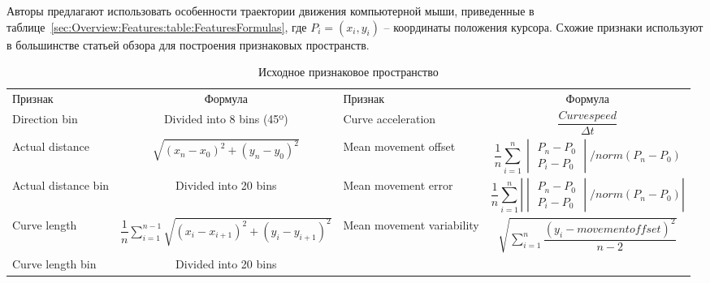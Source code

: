 \documentclass[12pt]{article}
\begin{document}
    \par Авторы \cite{Mondal} предлагают использовать особенности траектории движения компьютерной мыши, приведенные в таблице~\ref{sec:Overview:Features:table:FeaturesFormulas}, где $P_i = (x_i, y_i)$ -- координаты положения курсора. Схожие признаки используют в большинстве статьей обзора для построения признаковых пространств.

    \begin{table}[h]
        \centering
        \footnotesize
        \renewcommand{\arraystretch}{1.5}
        \renewcommand{\tabcolsep}{1mm}
        \caption{Исходное признаковое пространство}
        \begin{tabular}[c]{ || m{20mm} | c || m{20mm} | c ||}
            \hhline{|t:==:t:==:t|} 
            Признак & Формула &  Признак &  Формула \\ [2mm]
            \hhline{|:==::==:|} 
            Direction bin & \centering Divided into 8 bins (45º) &
            Curve acceleration & {\centering $ \dfrac{Curvespeed}{\Delta t} $} \\
            \hhline{||-|-||-|-||}
            Actual distance & {\centering $ \sqrt{(x_n-x_0)^2 + (y_n-y_0)^2} $} &
            Mean movement offset & \begin{equation*} \dfrac{1}{n} \sum_{i=1}^{n} \begin{vmatrix} P_n - P_0 \\ P_i - P_0  \end{vmatrix} / norm(P_n - P_0) \end{equation*} \\
            \hhline{||-|-||-|-||}
            Actual distance bin & {\centering Divided into 20 bins} &
            Mean movement error & {\centering \begin{equation*} \dfrac{1}{n} \sum_{i=1}^{n} \left| \begin{vmatrix} P_n - P_0 \\ P_i - P_0  \end{vmatrix} / norm(P_n - P_0) \right| \end{equation*}} \\
            \hhline{||-|-||-|-||}
            Curve length & {\centering $ \dfrac{1}{n} \sum\limits_{i=1}^{n-1} \sqrt{(x_i-x_{i+1})^2 + (y_i-y_{i+1})^2} $} &
            Mean movement variability & {\centering $ \sqrt{\sum\limits_{i=1}^{n} \dfrac{(y_i - movementoffset)^2}{n-2}} $} \\
            \hhline{||-|-||-|-||}
            Curve length bin & {\centering Divided into 20 bins} &

\end{tabular}
\end{table}
\end{document}
